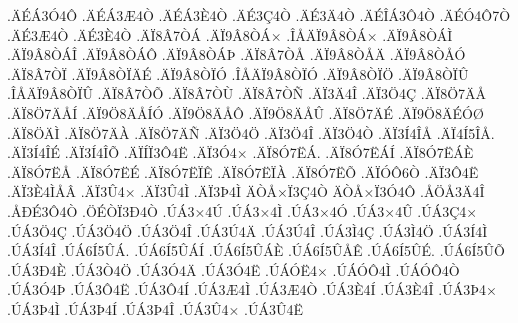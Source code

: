 {.^^c4^^c9^^c13^^d34^^d4
.^^c4^^c9^^c13^^c64^^d2
.^^c4^^c9^^c13^^c84^^d2
.^^c4^^c93^^c74^^d2
.^^c4^^c93^^c44^^d2
.^^c4^^c9^^ce^^c13^^d44^^d2
.^^c4^^c9^^d34^^d47^^d2
.^^c4^^c93^^c64^^d2
.^^c4^^c93^^c84^^d2
.^^c4^^cf8^^c27^^d2^^c1
.^^c4^^cf9^^c28^^d2^^c1^^d7
.^^ce^^c5^^c4^^cf9^^c28^^d2^^c1^^d7
.^^c4^^cf9^^c28^^d2^^c1^^cc
.^^c4^^cf9^^c28^^d2^^c1^^ce
.^^c4^^cf9^^c28^^d2^^c1^^d4
.^^c4^^cf9^^c28^^d2^^c1^^de
.^^c4^^cf8^^c27^^d2^^c5
.^^c4^^cf9^^c28^^d2^^c5^^c4
.^^c4^^cf9^^c28^^d2^^c5^^d3
.^^c4^^cf8^^c27^^d2^^cf
.^^c4^^cf9^^c28^^d2^^cf^^c4^^c9
.^^c4^^cf9^^c28^^d2^^cf^^d3
.^^ce^^c5^^c4^^cf9^^c28^^d2^^cf^^d3
.^^c4^^cf9^^c28^^d2^^cf^^d6
.^^c4^^cf9^^c28^^d2^^cf^^db
.^^ce^^c5^^c4^^cf9^^c28^^d2^^cf^^db
.^^c4^^cf8^^c27^^d2^^d5
.^^c4^^cf8^^c27^^d2^^d9
.^^c4^^cf8^^c27^^d2^^d1
.^^c4^^cf3^^c44^^ce
.^^c4^^cf3^^d64^^c7
.^^c4^^cf8^^d67^^c4^^c5
.^^c4^^cf8^^d67^^c4^^c5^^cd
.^^c4^^cf9^^d68^^c4^^c5^^cd^^d3
.^^c4^^cf9^^d68^^c4^^c5^^d4
.^^c4^^cf9^^d68^^c4^^c5^^db
.^^c4^^cf8^^d67^^c4^^c9
.^^c4^^cf9^^d68^^c4^^c9^^d3^^d8
.^^c4^^cf8^^d6^^c4^^cc
.^^c4^^cf8^^d67^^c4^^c0
.^^c4^^cf8^^d67^^c4^^d1
.^^c4^^cf3^^d64^^d6
.^^c4^^cf3^^d64^^ce
.^^c4^^cf3^^d64^^d2
.^^c4^^cf3^^cd4^^ce^^c5
.^^c4^^cf4^^cd5^^ce^^c5.
.^^c4^^cf3^^cd4^^ce^^c9
.^^c4^^cf3^^cd4^^ce^^d5
.^^c4^^cf^^cd^^cf3^^d44^^cb
.^^c4^^cf3^^d34^^d7
.^^c4^^cf8^^d37^^cb^^c1.
.^^c4^^cf8^^d37^^cb^^c1^^cd
.^^c4^^cf8^^d37^^cb^^c1^^c8
.^^c4^^cf8^^d37^^cb^^c5
.^^c4^^cf8^^d37^^cb^^c9
.^^c4^^cf8^^d37^^cb^^cf^^ca
.^^c4^^cf8^^d37^^cb^^cf^^c0
.^^c4^^cf8^^d37^^cb^^d5
.^^c4^^cf^^d3^^d46^^d2
.^^c4^^cf3^^d44^^cb
.^^c4^^cf3^^c84^^cc^^c5^^c2
.^^c4^^cf3^^db4^^d7
.^^c4^^cf3^^db4^^cc
.^^c4^^cf3^^de4^^cc
^^c4^^d2^^c5^^d7^^cf3^^c74^^d2
^^c4^^d2^^c5^^d7^^cf3^^d34^^d4
.^^c5^^d6^^c53^^c44^^ce
.^^c5^^d0^^c93^^d44^^d2
.^^d6^^c9^^d2^^cf3^^d04^^d2
.^^da^^c13^^d74^^da
.^^da^^c13^^d74^^cc
.^^da^^c13^^d74^^d3
.^^da^^c13^^d74^^db
.^^da^^c13^^c74^^d7
.^^da^^c13^^d64^^c7
.^^da^^c13^^d64^^d6
.^^da^^c13^^d64^^ce
.^^da^^c13^^da4^^c4
.^^da^^c13^^da4^^ce
.^^da^^c13^^cc4^^c7
.^^da^^c13^^cc4^^d6
.^^da^^c13^^cd4^^cc
.^^da^^c13^^cd4^^ce
.^^da^^c16^^cd5^^db^^c1.
.^^da^^c16^^cd5^^db^^c1^^cd
.^^da^^c16^^cd5^^db^^c1^^c8
.^^da^^c16^^cd5^^db^^c5^^ca
.^^da^^c16^^cd5^^db^^c9.
.^^da^^c16^^cd5^^db^^d5
.^^da^^c13^^d04^^c8
.^^da^^c13^^d24^^d6
.^^da^^c13^^d34^^c4
.^^da^^c13^^d34^^cb
.^^da^^c1^^d3^^cb4^^d7
.^^da^^c1^^d3^^d44^^cc
.^^da^^c1^^d3^^d44^^d2
.^^da^^c13^^d34^^de
.^^da^^c13^^d44^^cb
.^^da^^c13^^d44^^cd
.^^da^^c13^^c64^^cc
.^^da^^c13^^c64^^d2
.^^da^^c13^^c84^^cd
.^^da^^c13^^c84^^ce
.^^da^^c13^^de4^^d7
.^^da^^c13^^de4^^cc
.^^da^^c13^^de4^^cd
.^^da^^c13^^de4^^ce
.^^da^^c13^^db4^^d7
.^^da^^c13^^db4^^cb
}
